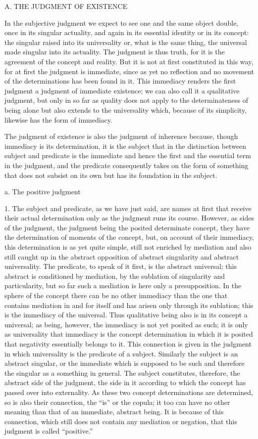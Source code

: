 A. THE JUDGMENT OF EXISTENCE

In the subjective judgment we expect to see
one and the same object double,
once in its singular actuality,
and again in its essential identity
or in its concept:
the singular raised into its universality
or, what is the same thing,
the universal made singular into its actuality.
The judgment is thus truth,
for it is the agreement of the concept and reality.
But it is not at first constituted in this way,
for at first the judgment is immediate,
since as yet no reflection and no movement
of the determinations has been found in it.
This immediacy renders the first judgment
a judgment of immediate existence;
we can also call it a qualitative judgment,
but only in so far as quality does not apply
to the determinateness of being alone
but also extends to the universality
which, because of its simplicity,
likewise has the form of immediacy.

The judgment of existence is also
the judgment of inherence because,
though immediacy is its determination,
it is the subject that in the distinction
between subject and predicate is the immediate
and hence the first and the essential
term in the judgment,
and the predicate consequently takes on
the form of something that does not subsist on its own
but has its foundation in the subject.

a. The positive judgment

1. The subject and predicate, as we have just said,
are names at first that receive their actual determination
only as the judgment runs its course.
However, as sides of the judgment,
the judgment being the posited determinate concept,
they have the determination of moments of the concept,
but, on account of their immediacy,
this determination is as yet quite simple,
still not enriched by mediation
and also still caught up in
the abstract opposition of
abstract singularity
and abstract universality.
The predicate, to speak of it first,
is the abstract universal;
this abstract is conditioned by mediation,
by the sublation of singularity and particularity,
but so far such a mediation is here only a presupposition.
In the sphere of the concept
there can be no other immediacy
than the one that contains
mediation in and for itself
and has arisen only through its sublation;
this is the immediacy of the universal.
Thus qualitative being also is
in its concept a universal;
as being, however, the immediacy is
not yet posited as such;
it is only as universality
that immediacy is the concept determination
in which it is posited that
negativity essentially belongs to it.
This connection is given in the judgment
in which universality is the predicate of a subject.
Similarly the subject is an abstract singular,
or the immediate which is supposed to be such
and therefore the singular as a something in general.
The subject constitutes, therefore,
the abstract side of the judgment,
the side in it according to which
the concept has passed over into externality.
As these two concept determinations are determined,
so is also their connection,
the “is” or the copula;
it too can have no other meaning than
that of an immediate, abstract being.
It is because of this connection,
which still does not contain any mediation or negation,
that this judgment is called “positive.”

